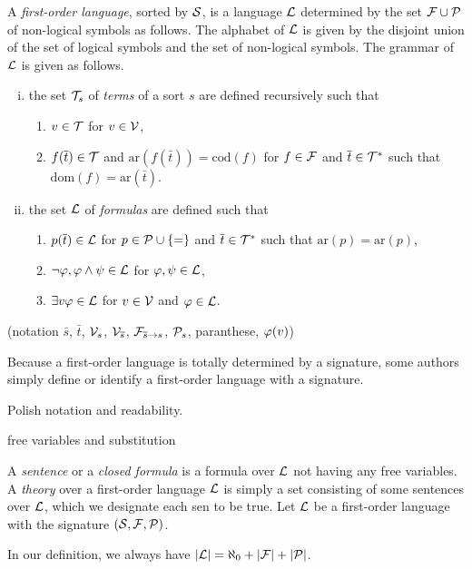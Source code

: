 \documentclass{../../large}
\begin{document}
\begin{prb}
A \emph{first-order language}, sorted by $\mathcal{S}$, is a language $\mathcal{L}$ determined by the set $\mathcal{F}\cup\mathcal{P}$ of non-logical symbols as follows. 
The alphabet of $\mathcal{L}$ is given by the disjoint union of the set of logical symbols and the set of non-logical symbols.
The grammar of $\mathcal{L}$ is given as follows.
\begin{enumerate}[(i)]
\item the set $\mathcal{T}_s$ of \emph{terms} of a sort $s$ are defined recursively such that
\begin{enumerate}[(\text{i}.i)]
\item $v\in\mathcal{T}$ for $v\in\mathcal{V}$,
\item $f(\overline t)\in\mathcal{T}$ and $\mathrm{ar}(f(\bar t))=\mathrm{cod}(f)$ for $f\in\mathcal{F}$ and $\overline t\in\mathcal{T}^*$ such that $\mathrm{dom}(f)=\mathrm{ar}(\bar t)$.
\end{enumerate}
\item the set $\mathcal{L}$ of \emph{formulas} are defined such that
\begin{enumerate}
\item $p(\overline t)\in\mathcal{L}$ for $p\in\mathcal{P}\cup\{=\}$ and $\overline t\in\mathcal{T}^*$ such that $\mathrm{ar}(p)=\mathrm{ar}(p)$,
\item $\neg\varphi,\varphi\wedge\psi\in\mathcal{L}$ for $\varphi,\psi\in\mathcal{L}$,
\item $\exists v\varphi\in\mathcal{L}$ for $v\in\mathcal{V}$ and $\varphi\in\mathcal{L}$.
\end{enumerate}
\end{enumerate}
(notation $\bar s$, $\bar t$, $\mathcal{V}_s$, $\mathcal{V}_{\overline s}$, $\mathcal{F}_{\overline s\to s}$, $\mathcal{P}_s$, paranthese, $\varphi(v)$)


Because a first-order language is totally determined by a signature, some authors simply define or identify a first-order language with a signature.


Polish notation and readability.


free variables and substitution

A \emph{sentence} or a \emph{closed formula} is a formula over $\mathcal{L}$ not having any free variables.
A \emph{theory} over a first-order language $\mathcal{L}$ is simply a set consisting of some sentences over $\mathcal{L}$, which we designate each sen to be true.
Let $\mathcal{L}$ be a first-order language with the signature $(\mathcal{S},\mathcal{F},\mathcal{P})$.
\begin{parts}
\item In our definition, we always have $|\mathcal{L}|=\aleph_0+|\mathcal{F}|+|\mathcal{P}|$.
\item 
\end{parts}
\end{prb}
\end{document}
